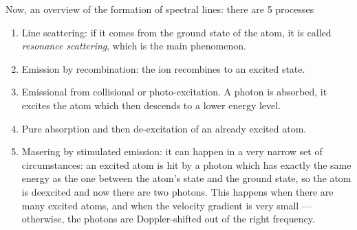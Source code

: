 \documentclass[main.tex]{subfiles}
\begin{document}
Now, an overview of the formation of spectral lines:
there are 5 processes \begin{enumerate}
    \item Line scattering: if it comes from the ground state of the atom, it is called \emph{resonance scattering}, which is the main phenomenon.
    \item Emission by recombination: the ion recombines to an excited state.
    \item Emissional from collisional or photo-excitation. A photon is absorbed, it excites the atom which then descends to a lower energy level.
    \item Pure absorption and then de-excitation of an already excited atom.
    \item Masering by stimulated emission: it can happen in a very narrow set of circumstances: an excited atom is hit by a photon which has exactly the same energy as the one between the atom's state and the ground state, so the atom is deexcited and now there are two photons.
    This happens when there are many excited atoms, and when the velocity gradient is very small --- otherwise, the photons are Doppler-shifted out of the right frequency.
\end{enumerate}
\end{document}
